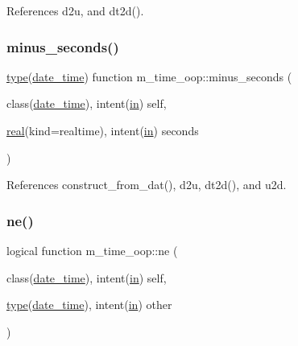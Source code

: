 References d2u, and dt2d().

\mbox{\label{namespacem__time__oop_a395fbf19c6617641aea39c33fd4b2087}} 
\subsubsection{\texorpdfstring{minus\+\_\+seconds()}{minus\_seconds()}}
{\footnotesize\ttfamily \hyperlink{stop__watch_83_8txt_a70f0ead91c32e25323c03265aa302c1c}{type}(\hyperlink{structm__time__oop_1_1date__time}{date\+\_\+time}) function m\+\_\+time\+\_\+oop\+::minus\+\_\+seconds (\begin{DoxyParamCaption}\item[{class(\hyperlink{structm__time__oop_1_1date__time}{date\+\_\+time}), intent(\hyperlink{M__journal_83_8txt_afce72651d1eed785a2132bee863b2f38}{in})}]{self,  }\item[{\hyperlink{read__watch_83_8txt_abdb62bde002f38ef75f810d3a905a823}{real}(kind=realtime), intent(\hyperlink{M__journal_83_8txt_afce72651d1eed785a2132bee863b2f38}{in})}]{seconds }\end{DoxyParamCaption})\hspace{0.3cm}{\ttfamily [private]}}



References construct\+\_\+from\+\_\+dat(), d2u, dt2d(), and u2d.

\mbox{\label{namespacem__time__oop_a7707a7cbd4869301a613ceeb12ed2384}} 
\subsubsection{\texorpdfstring{ne()}{ne()}}
{\footnotesize\ttfamily logical function m\+\_\+time\+\_\+oop\+::ne (\begin{DoxyParamCaption}\item[{class(\hyperlink{structm__time__oop_1_1date__time}{date\+\_\+time}), intent(\hyperlink{M__journal_83_8txt_afce72651d1eed785a2132bee863b2f38}{in})}]{self,  }\item[{\hyperlink{stop__watch_83_8txt_a70f0ead91c32e25323c03265aa302c1c}{type}(\hyperlink{structm__time__oop_1_1date__time}{date\+\_\+time}), intent(\hyperlink{M__journal_83_8txt_afce72651d1eed785a2132bee863b2f38}{in})}]{other }\end{DoxyParamCaption})\hspace{0.3cm}{\ttfamily [private]}}



